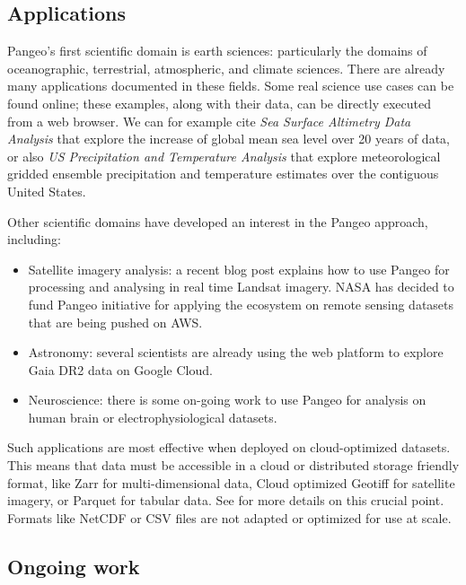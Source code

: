\documentclass{article}
\begin{document}
\subsection{Applications}
\label{ssec:applications}

Pangeo's first scientific domain is earth sciences: particularly the domains of oceanographic, terrestrial, atmospheric, and climate sciences. There are already many applications documented in these fields. Some real science use cases can be found online\cite{b5}; these examples, along with their data, can be directly executed from a web browser. We can for example cite \textit{Sea Surface Altimetry Data Analysis} that explore the increase of global mean sea level over 20 years of data, or also \textit{US Precipitation and Temperature Analysis} that explore meteorological gridded ensemble precipitation and temperature estimates over the contiguous United States.

Other scientific domains have developed an interest in the Pangeo approach, including:
\begin{itemize}
\item Satellite imagery analysis: a recent blog post\cite{b6} explains how to use Pangeo for processing and analysing in real time Landsat imagery. NASA has decided to fund Pangeo initiative for applying the ecosystem on remote sensing datasets that are being pushed on AWS.
\item Astronomy: several scientists are already using the web platform to explore Gaia DR2 data on Google Cloud.
\item Neuroscience: there is some on-going work to use Pangeo for analysis on human brain or electrophysiological datasets.
\end{itemize}

Such applications are most effective when deployed on cloud-optimized datasets. This means that data must be accessible in a cloud or distributed storage friendly format, like Zarr for multi-dimensional data, Cloud optimized Geotiff for satellite imagery, or Parquet for tabular data. See \cite{b7} for more details on this crucial point. Formats like NetCDF or CSV files are not adapted or optimized for use at scale.

\subsection{Ongoing work}
\label{ssec:ongowork}
\end{document}
